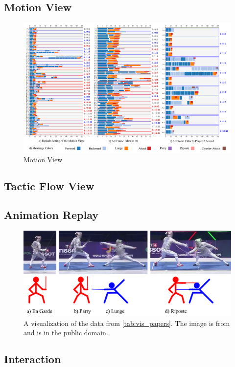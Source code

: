 \documentclass[journal]{vgtc}                %
\begin{document}
\subsection{Motion View}

\begin{figure}[tb]
	\centering
	\includegraphics[width=\linewidth]{motionview}
	\caption{Motion View}
	\label{fig:motionview}
\end{figure}

\subsection{Tactic Flow View}
\subsection{Animation Replay}
\begin{figure}[tb]
	\centering
	\includegraphics[width=\columnwidth]{glyph}
	\caption{A visualization of the data from \autoref{tab:vis_papers}. The image is from \cite{Isenberg:2017:VMC} and is in the public domain.}
	\label{fig:sample}
\end{figure}
\subsection{Interaction}
\end{document}
